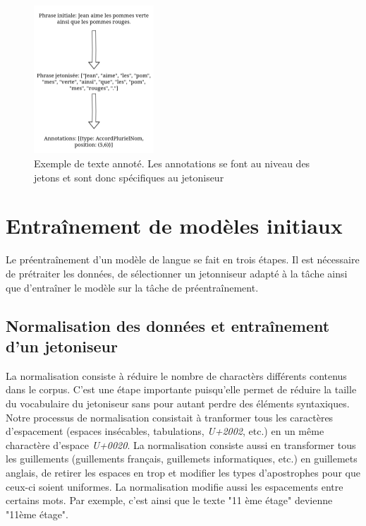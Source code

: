 \documentclass[12pt,twoside,maitrise]{dms}
\theoremstyle{definition}
\numberwithin{equation}{section}
\numberwithin{table}{chapter}
\numberwithin{figure}{chapter}
\begin{document}
\begin{figure}
	\begin{center}
		\includegraphics[width=0.4\textwidth]{figures/exemple_annotation.png}
	\end{center}
	\caption{Exemple de texte annoté. Les annotations se font au niveau des jetons et sont donc spécifiques au jetoniseur}
	\label{fig:ex_annotation}
\end{figure}


\chapter{Entraînement de modèles initiaux}
Le préentraînement d'un modèle de langue se fait en trois étapes. Il est
nécessaire de prétraiter les données, de sélectionner un jetonniseur adapté à
la tâche ainsi que d'entraîner le modèle sur la tâche de préentraînement.

\section{Normalisation des données et entraînement d'un jetoniseur}
La normalisation consiste à réduire le nombre de charactèrs différents contenus
dans le corpus. C'est une étape importante puisqu'elle permet de réduire la
taille du vocabulaire du jetoniseur sans pour autant perdre des éléments
syntaxiques. Notre processus de normalisation consistait à tranformer tous les
caractères d'espacement (espaces insécables, tabulations, \textit{U+2002},
etc.) en un même charactère d'espace \textit{U+0020}. La normalisation consiste
aussi en transformer tous les guillements (guillements français, guillemets
informatiques, etc.) en guillemets anglais, de retirer les espaces en trop et
modifier les types d'apostrophes pour que ceux-ci soient uniformes. La
normalisation modifie aussi les espacements entre certains mots. Par exemple,
c'est ainsi que le texte "11 ème étage" devienne "11ème étage".\\
\end{document}
